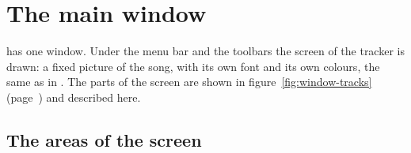 \chapter{The main window}\label{ch:window}

\RITMO{} has one window. Under the menu bar and the toolbars the screen of the tracker is drawn: a fixed picture of
the song, with its own font and its own colours, the same as in \RMT{}. The parts of the screen are shown in
figure~\ref{fig:window-tracks} (page~\pageref{fig:window-tracks}) and described here.


\section{The areas of the screen}


